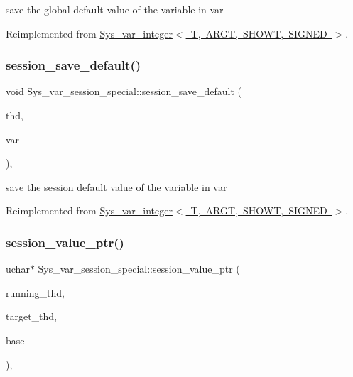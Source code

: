 save the global default value of the variable in var 

Reimplemented from \mbox{\hyperlink{classSys__var__integer_a59952c5211c10659bc16a0f5f5706e9f}{Sys\+\_\+var\+\_\+integer$<$ T, A\+R\+G\+T, S\+H\+O\+W\+T, S\+I\+G\+N\+E\+D $>$}}.

\mbox{\label{classSys__var__session__special_a1a685de0cd05c6161889034e899178b2}} 
\subsubsection{\texorpdfstring{session\+\_\+save\+\_\+default()}{session\_save\_default()}}
{\footnotesize\ttfamily void Sys\+\_\+var\+\_\+session\+\_\+special\+::session\+\_\+save\+\_\+default (\begin{DoxyParamCaption}\item[{T\+HD $\ast$}]{thd,  }\item[{\mbox{\hyperlink{classset__var}{set\+\_\+var}} $\ast$}]{var }\end{DoxyParamCaption})\hspace{0.3cm}{\ttfamily [inline]}, {\ttfamily [virtual]}}

save the session default value of the variable in var 

Reimplemented from \mbox{\hyperlink{classSys__var__integer_aed46d5a98789b087a079ff51f1d6a9a7}{Sys\+\_\+var\+\_\+integer$<$ T, A\+R\+G\+T, S\+H\+O\+W\+T, S\+I\+G\+N\+E\+D $>$}}.

\mbox{\label{classSys__var__session__special_afd6109e270df2c53c15536de4929ece3}} 
\subsubsection{\texorpdfstring{session\+\_\+value\+\_\+ptr()}{session\_value\_ptr()}}
{\footnotesize\ttfamily uchar$\ast$ Sys\+\_\+var\+\_\+session\+\_\+special\+::session\+\_\+value\+\_\+ptr (\begin{DoxyParamCaption}\item[{T\+HD $\ast$}]{running\+\_\+thd,  }\item[{T\+HD $\ast$}]{target\+\_\+thd,  }\item[{L\+E\+X\+\_\+\+S\+T\+R\+I\+NG $\ast$}]{base }\end{DoxyParamCaption})\hspace{0.3cm}{\ttfamily [inline]}, {\ttfamily [virtual]}}

